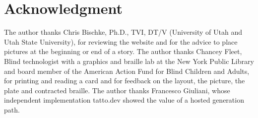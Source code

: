 \documentclass[conference]{IEEEtran}
\begin{document}
\section*{Acknowledgment}

The author thanks Chris Bischke, Ph.D., TVI, DT/V (University of Utah and Utah State University), for reviewing the website and for the advice to place pictures at the beginning or end of a story. The author thanks Chancey Fleet, Blind technologist with a graphics and braille lab at the New York Public Library and board member of the American Action Fund for Blind Children and Adults, for printing and reading a card and for feedback on the layout, the picture, the plate and contracted braille. The author thanks Francesco Giuliani, whose independent implementation tatto.dev showed the value of a hosted generation path.
\end{document}
